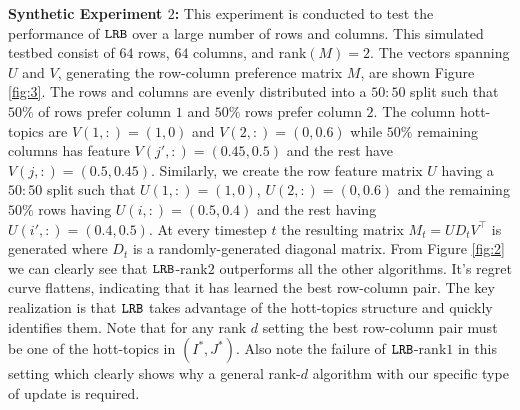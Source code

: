 \textbf{Synthetic Experiment $2$:} This experiment is conducted to test the performance of ${\tt LRB}$ over a large number of rows and columns. This simulated testbed consist of $64$ rows, $64$ columns, and rank$(M) = 2$. The vectors spanning $U$ and $V$, generating the row-column preference matrix $M$, are shown Figure \ref{fig:3}. The rows and columns are evenly distributed into a $50:50$ split such that $50\%$ of rows prefer column $1$ and $50\%$ rows prefer column $2$. The column hott-topics are $V(1,:) = (1,0)$ and $V(2,:) = (0, 0.6)$ while $50\%$ remaining  columns has feature $V(j',:) = (0.45, 0.5)$ and the rest have $V(j,:) = (0.5, 0.45)$. Similarly, we create the row feature matrix $U$ having a $50:50$ split such that $U(1,:) = (1,0)$, $U(2,:) = (0,0.6)$ and the remaining $50\%$ rows having $U(i,:) = (0.5,0.4)$ and the rest having $U(i',:) = (0.4,0.5)$. At every timestep $t$ the resulting matrix $M_t =UD_tV^{\intercal}$ is generated where $D_t$ is a randomly-generated diagonal matrix. From Figure \ref{fig:2} we can clearly see that ${\tt LRB}$-rank$2$ outperforms all the other algorithms. It's  regret curve flattens, indicating that it has learned the best row-column pair. The key realization is that ${\tt LRB}$ takes advantage of the hott-topics structure and quickly identifies them. Note that for any rank $d$ setting the best row-column pair must be one of the hott-topics in $(I^*, J^*)$. Also note the failure of ${\tt LRB}$-rank$1$ in this setting which clearly shows why a general rank-$d$ algorithm with our specific type of update is required. 

